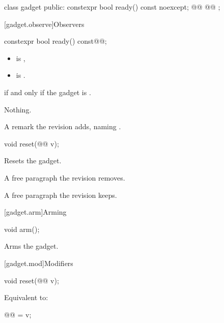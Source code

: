\begin{codeblock}
class gadget {
public:
  constexpr bool ready() const noexcept;
@@
@@
};
\end{codeblock}

[gadget.observe]{Observers}

\begin{itemdecl}
constexpr bool ready() const@@;
\end{itemdecl}

\begin{itemdescr}
\pnum
\constraints
\begin{itemize}
\item {} is ,
\item {} is .
\end{itemize}

\pnum
\returns
{} if and only if the gadget is .

\begin{removedblock}
\pnum
\throws
Nothing.
\end{removedblock}

\begin{addedblock}
\pnum
\remarks
A remark the revision adds, naming .
\end{addedblock}
\end{itemdescr}

\begin{addedblock}
\begin{itemdecl}
void reset(@@ v);
\end{itemdecl}

\begin{itemdescr}
\pnum
\effects
Resets the gadget.
\end{itemdescr}
\end{addedblock}

\begin{removedblock}
\pnum
A free paragraph the revision removes.
\end{removedblock}

\pnum
A free paragraph the revision keeps.

\begin{removedblock}
[gadget.arm]{Arming}

\begin{itemdecl}
void arm();
\end{itemdecl}

\begin{itemdescr}
\pnum
\effects
Arms the gadget.
\end{itemdescr}
\end{removedblock}

\begin{addedblock}
[gadget.mod]{Modifiers}

\begin{itemdecl}
void reset(@@ v);
\end{itemdecl}

\begin{itemdescr}
\pnum
\effects
Equivalent to:
\begin{codeblock}
@@ = v;
\end{codeblock}
\end{itemdescr}
\end{addedblock}
